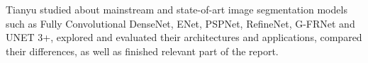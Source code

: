 \documentclass{article}
\begin{document}
Tianyu studied about mainstream and state-of-art image segmentation models such as Fully Convolutional DenseNet, ENet, PSPNet, RefineNet, G-FRNet and UNET 3+, explored and evaluated their architectures and applications, compared their differences, as well as finished relevant part of the report.



\end{document}
